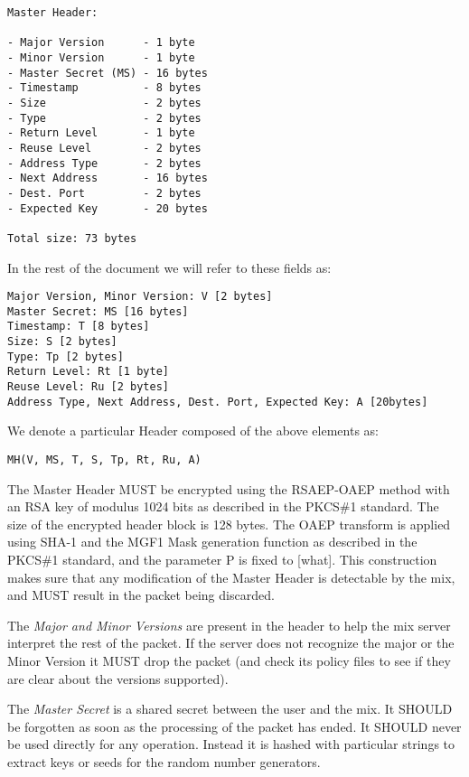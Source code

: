 \documentclass{article}
\begin{document}
\begin{verbatim}
Master Header:

- Major Version      - 1 byte
- Minor Version      - 1 byte
- Master Secret (MS) - 16 bytes
- Timestamp          - 8 bytes
- Size               - 2 bytes
- Type               - 2 bytes
- Return Level       - 1 byte
- Reuse Level        - 2 bytes
- Address Type       - 2 bytes
- Next Address       - 16 bytes
- Dest. Port         - 2 bytes
- Expected Key       - 20 bytes

Total size: 73 bytes
\end{verbatim}

In the rest of the document we will refer to these fields as:

\begin{verbatim}
Major Version, Minor Version: V [2 bytes]
Master Secret: MS [16 bytes]
Timestamp: T [8 bytes]
Size: S [2 bytes]
Type: Tp [2 bytes]
Return Level: Rt [1 byte]
Reuse Level: Ru [2 bytes]
Address Type, Next Address, Dest. Port, Expected Key: A [20bytes]
\end{verbatim}

We denote a particular Header composed of the above elements as:

\begin{verbatim}MH(V, MS, T, S, Tp, Rt, Ru, A)\end{verbatim}

The Master Header MUST be encrypted using the RSAEP-OAEP method with
an RSA key of modulus 1024 bits as described in the PKCS\#1
standard. The size of the encrypted header block is 128 bytes. The
OAEP transform is applied using SHA-1 and the MGF1 Mask 
generation function as described in the PKCS\#1 standard, and the 
parameter P is fixed to [what]. This construction 
makes sure that any modification of the Master Header is detectable by 
the mix, and MUST result in the packet being discarded.

The \emph{Major and Minor Versions} are present in the header to help the mix
server interpret the rest of the packet. If the server does not recognize
the major or the Minor Version it MUST drop the packet (and check
its policy files to see if they are clear about the versions supported).

The \emph{Master Secret} is a shared secret between the user and the
mix. It SHOULD be forgotten as soon as the processing of the packet
has ended. It SHOULD never be used directly for any operation. Instead
it is hashed with particular strings to extract keys or seeds for the
random number generators.
\end{document}
